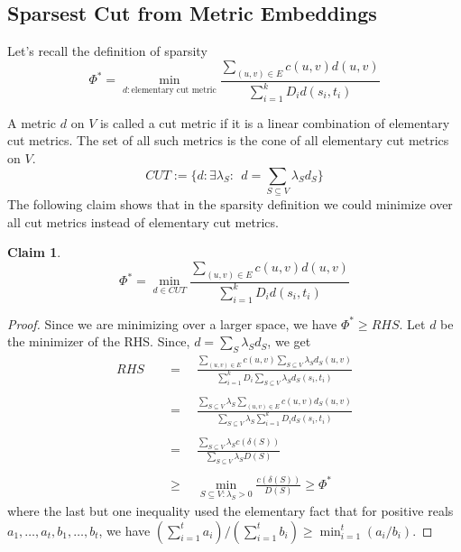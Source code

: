 \documentclass[11pt]{article}
\newtheorem{claim}{Claim}
\begin{document}
\subsection*{Sparsest Cut from Metric Embeddings}
Let's recall the definition of sparsity
\begin{equation}\label{eq:sparsitydefn}
\Phi^* = \min_{d: \textrm{elementary cut metric}} \frac{\sum_{(u,v)\in E} c(u,v)d(u,v)}{\sum_{i=1}^k D_id(s_i,t_i)}
\end{equation}

A metric $d$ on $V$ is called a cut metric if it is a linear combination of elementary cut metrics. 
The set of all such metrics is the cone of all elementary cut metrics on $V$.
$$CUT := \{d: \exists \lambda_S: ~~ d=\sum_{S\subseteq V} \lambda_S d_S\}$$
\noindent
The following claim shows that in the sparsity definition we could minimize over all cut metrics
instead of elementary cut metrics.


\begin{claim}
\begin{equation}\label{eq:phicut}
\Phi^* = \min_{d \in CUT} \frac{\sum_{(u,v)\in E} c(u,v)d(u,v)}{\sum_{i=1}^k D_id(s_i,t_i)}
\end{equation}
\end{claim}
\begin{proof}
Since we are minimizing over a larger space, we have $\Phi^* \ge RHS$.
Let $d$ be the minimizer of the RHS. Since, $d = \sum_S \lambda_Sd_S$, we get
\begin{align*}
RHS & \quad = \quad  \frac{\sum_{(u,v)\in E} c(u,v)\sum_{S\subseteq V} \lambda_Sd_S(u,v)}{\sum_{i=1}^k D_i\sum_{S\subseteq V} \lambda_Sd_S(s_i,t_i)} \\
\\
& \quad = \quad \frac{\sum_{S\subseteq V} \lambda_S\sum_{(u,v)\in E} c(u,v)d_S(u,v) }{\sum_{S\subseteq V} \lambda_S\sum_{i=1}^k D_id_S(s_i,t_i) } \\
\\
& \quad = \quad \frac{\sum_{S\subseteq V}\lambda_Sc(\delta(S))}{\sum_{S\subseteq V}\lambda_SD(S)} \\
\\
& \quad \ge \quad \min_{S\subseteq V:\lambda_S> 0}\frac{c(\delta(S))}{D(S)} \ge \Phi^*
\end{align*}
where the last but one inequality used the elementary fact that for positive reals $a_1,\ldots,a_t,b_1,\ldots,b_t$, we have $(\sum_{i=1}^t  a_i)/(\sum_{i=1}^t b_i) \ge \min_{i=1}^t (a_i/b_i).$
\end{proof}
\end{document}
